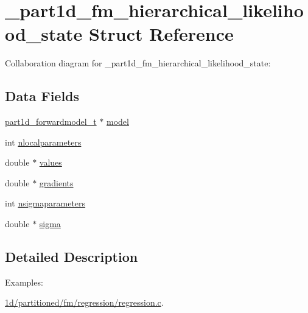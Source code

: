 \hypertarget{struct__part1d__fm__hierarchical__likelihood__state}{}\section{\+\_\+part1d\+\_\+fm\+\_\+hierarchical\+\_\+likelihood\+\_\+state Struct Reference}
\label{struct__part1d__fm__hierarchical__likelihood__state}


Collaboration diagram for \+\_\+part1d\+\_\+fm\+\_\+hierarchical\+\_\+likelihood\+\_\+state\+:
\subsection*{Data Fields}
\begin{DoxyCompactItemize}
\item 
\hyperlink{part1d__forwardmodel_8h_adaad64fbca97fa82ba80fe8371e4f1d9}{part1d\+\_\+forwardmodel\+\_\+t} $\ast$ \hyperlink{struct__part1d__fm__hierarchical__likelihood__state_a1eed96fbd7d5ac0cb2c58e739d155340}{model}
\item 
int \hyperlink{struct__part1d__fm__hierarchical__likelihood__state_a7506e3fdcf51f3c06da9d0f7334b20ec}{nlocalparameters}
\item 
double $\ast$ \hyperlink{struct__part1d__fm__hierarchical__likelihood__state_a5ae0d97a1f21f2b937ccb661f61b55ce}{values}
\item 
double $\ast$ \hyperlink{struct__part1d__fm__hierarchical__likelihood__state_af67f81e95607d14619fb7160a87b45d0}{gradients}
\item 
int \hyperlink{struct__part1d__fm__hierarchical__likelihood__state_a0ae7566f0efad77db75a32b5de663d28}{nsigmaparameters}
\item 
double $\ast$ \hyperlink{struct__part1d__fm__hierarchical__likelihood__state_ad154bb322c0f848f02cba9712535c7b8}{sigma}
\end{DoxyCompactItemize}


\subsection{Detailed Description}
\begin{Desc}
\item[Examples\+: ]\par
\hyperlink{1d_2partitioned_2fm_2regression_2regression_8c-example}{1d/partitioned/fm/regression/regression.\+c}.\end{Desc}


